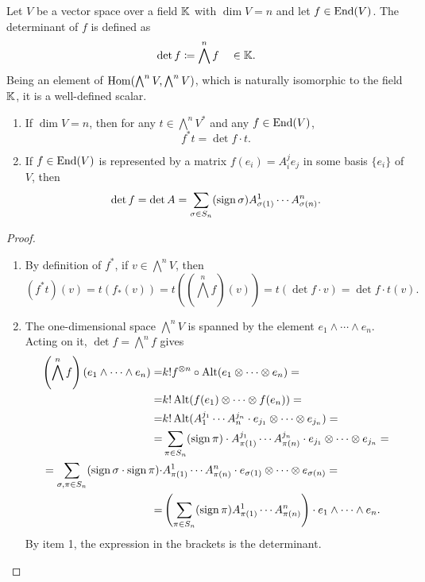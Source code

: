 \begin{defn}
Let $V$ be a vector space over a field $\mathbb{K}$ with $\dim V=n$ and let $f\in\operatorname{End}(V)$. The determinant of $f$ is defined as 
\[\det f\coloneqq \bigwedge^n f\quad \in\mathbb{K}.\] 
Being an element of $\operatorname{Hom}(\bigwedge^n V,\bigwedge^n V)$, which is naturally isomorphic to the field $\mathbb{K}$, it is a well-defined scalar. 
\end{defn}
\begin{prop}
\begin{enumerate}
    \item If $\dim V=n$, then for any $t\in\bigwedge^n V^\ast$ and any $f\in\operatorname{End}(V)$, 
    \[f^\ast t=\det f\cdot t.\]
    \item If $f\in\operatorname{End}(V)$ is represented by a matrix $f(e_i)=A_i^j e_j$ in some basis $\{e_i\}$ of $V$, then
    \[\det f=\det A=\sum_{\sigma\in S_n}(\operatorname{sign}\sigma)A^1_{\sigma(1)}\cdots A^n_{\sigma(n)}.\]
\end{enumerate}
\end{prop}
\begin{proof}
\begin{enumerate}
    \item By definition of $f^\ast$, if $v\in \bigwedge^n V$, then 
    \[(f^\ast t)(v)=t\left(f_\ast(v)\right)=t\left(\left(\bigwedge^n f\right)(v)\right)=t(\det f\cdot v)=\det f\cdot t(v).\]
    \item The one-dimensional space $\bigwedge^n V$ is spanned by the element $e_1\wedge \cdots \wedge e_n$. Acting on it, $\det f=\bigwedge^n f$ gives
    \begin{align}
        \left(\bigwedge^n f\right)(e_1\wedge \cdots \wedge e_n)=&k!f^{\otimes n}\circ \operatorname{Alt} (e_1\otimes \cdots \otimes e_n)=\\
        =&k!\operatorname{Alt}(f(e_1)\otimes\cdots\otimes f(e_n))=\notag
        \\
        =&k! \operatorname{Alt} (A^{j_1}_1 \cdots A^{j_n}_n \cdot e_{j_1}\otimes\cdots \otimes e_{j_n})=\\
        =&\sum_{\pi\in S_n}(\operatorname{sign}\pi)\cdot A_{\pi(1)}^{j_1}\cdots A_{\pi(n)}^{j_n}\cdot  e_{j_1}\otimes\cdots\otimes e_{j_n}=\notag
        \\
        =\sum_{\sigma,\pi\in S_n}(\operatorname{sign}\sigma\cdot\operatorname{sign}\pi) \cdot &A_{\pi(1)}^1\cdots A_{\pi(n)}^n\cdot e_{\sigma(1)}\otimes\cdots\otimes e_{\sigma(n)}=\notag
        \\
        =&\left(\sum_{\pi\in S_n}(\operatorname{sign}\pi)A^1_{\pi(1)}\cdots A^n_{\pi(n)}\right)\cdot e_1\wedge \cdots \wedge e_n.
    \end{align}
    By item 1, the expression in the brackets is the determinant.
\end{enumerate}
\end{proof}

